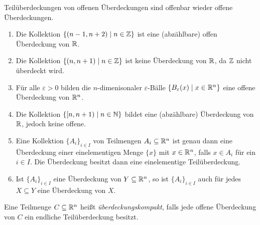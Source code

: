 \documentclass[a4paper,10pt]{article}
\begin{document}
\begin{bem}
 Teilüberdeckungen von offenen Überdeckungen sind offenbar wieder offene Überdeckungen.
\end{bem}



\begin{bsp}
 \begin{enumerate}
  \item
   Die Kollektion $\{(n-1,n+2) \mid n \in \mathbb{Z}\}$ ist eine (abzählbare) offen Überdeckung von $\mathbb{R}$.
  \item
   Die Kollektion $\{(n,n+1) \mid n \in \mathbb{Z}\}$ ist keine Überdeckung von $\mathbb{R}$, da $\mathbb{Z}$ nicht überdeckt wird.
  \item
   Für alle $\varepsilon > 0$ bilden die $n$-dimenisonaler $\varepsilon$-Bälle $\{B_\varepsilon(x) \mid x \in \mathbb{R}^n\}$ eine offene Überdeckung von $\mathbb{R}^n$.
  \item
   Die Kollektion $\{[n,n+1) \mid n \in \mathbb{N}\}$ bildet eine (abzählbare) Überdeckung von $\mathbb{R}$, jedoch keine offene.
  \item
   Eine Kollektion $\{A_i\}_{i \in I}$ von Teilmengen $A_i \subseteq \mathbb{R}^n$ ist genau dann eine Überdeckung einer einelementigen Menge $\{x\}$ mit $x \in \mathbb{R}^n$, falls $x \in A_i$ für ein $i \in I$. Die Überdeckung besitzt dann eine einelementige Teilüberdeckung.
  \item
   Ist $\{A_i\}_{i \in I}$ eine Überdeckung von $Y \subseteq \mathbb{R}^n$, so ist $\{A_i\}_{i \in I}$ auch für jedes $X \subseteq Y$ eine Überdeckung von $X$.
 \end{enumerate}
\end{bsp}


\begin{defi}
 Eine Teilmenge $C \subseteq \mathbb{R}^n$ heißt \emph{überdeckungskompakt}, falls jede offene Überdeckung von $C$ ein endliche Teilüberdeckung besitzt.
\end{defi}
\end{document}
